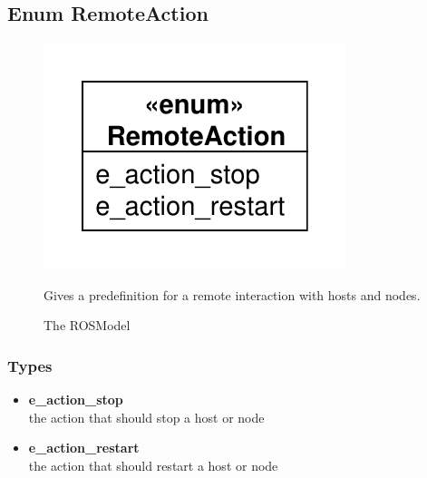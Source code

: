 \subsection{Enum RemoteAction}
\begin{figure}[htbp]
	\begin{minipage}[t]{7cm}
		\vspace{0pt}
		\centering
		\includegraphics[scale=0.6]{./diagram_pictures/RemoteAction.pdf}
		\caption{The ROSModel}
	\end{minipage}
	\hfill
	\begin{minipage}[t]{8cm}
		\vspace{10pt}
		Gives a predefinition for a remote interaction with hosts and nodes.
	\end{minipage}
\end{figure}  
\subsubsection{Types}
\begin{itemize}
	\item \textbf{e\_action\_stop}\\
	the action that should stop a host or node
	\item \textbf{e\_action\_restart}\\
	the action that should restart a host or node
\end{itemize}

\newpage
